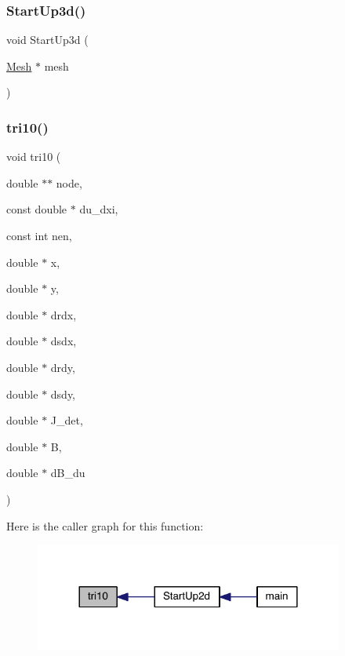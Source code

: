\subsubsection{\texorpdfstring{Start\+Up3d()}{StartUp3d()}}
{\footnotesize\ttfamily void Start\+Up3d (\begin{DoxyParamCaption}\item[{\hyperlink{a00557_aeffbe0891ab73a4d8964c9cb7978426e}{Mesh} $\ast$}]{mesh }\end{DoxyParamCaption})}

\mbox{\label{a00554_a5f6af94f39daf53ff33c328e81b7aeae}} 
\subsubsection{\texorpdfstring{tri10()}{tri10()}}
{\footnotesize\ttfamily void tri10 (\begin{DoxyParamCaption}\item[{double $\ast$$\ast$}]{node,  }\item[{const double $\ast$}]{du\+\_\+dxi,  }\item[{const int}]{nen,  }\item[{double $\ast$}]{x,  }\item[{double $\ast$}]{y,  }\item[{double $\ast$}]{drdx,  }\item[{double $\ast$}]{dsdx,  }\item[{double $\ast$}]{drdy,  }\item[{double $\ast$}]{dsdy,  }\item[{double $\ast$}]{J\+\_\+det,  }\item[{double $\ast$}]{B,  }\item[{double $\ast$}]{d\+B\+\_\+du }\end{DoxyParamCaption})}

Here is the caller graph for this function\+:\nopagebreak
\begin{figure}[H]
\begin{center}
\leavevmode
\includegraphics[width=288pt]{a00554_a5f6af94f39daf53ff33c328e81b7aeae_icgraph}
\end{center}
\end{figure}
\mbox{\label{a00554_aa275e5ac3935009592aad28f023ed4a1}} 
